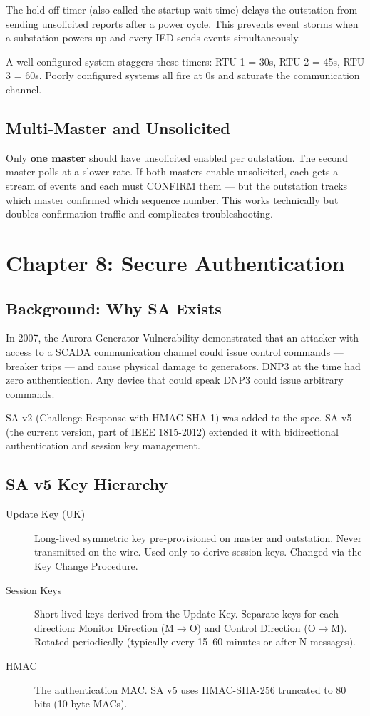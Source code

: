 \documentclass[11pt,twoside]{article}
\begin{document}
The hold-off timer (also called the startup wait time) delays the outstation from sending unsolicited reports after a power cycle. This prevents event storms when a substation powers up and every IED sends events simultaneously.

A well-configured system staggers these timers: RTU 1 = 30s, RTU 2 = 45s, RTU 3 = 60s. Poorly configured systems all fire at 0s and saturate the communication channel.

\subsection{Multi-Master and Unsolicited}

Only \textbf{one master} should have unsolicited enabled per outstation. The second master polls at a slower rate. If both masters enable unsolicited, each gets a stream of events and each must CONFIRM them --- but the outstation tracks which master confirmed which sequence number. This works technically but doubles confirmation traffic and complicates troubleshooting.

\section{Chapter 8: Secure Authentication}

\subsection{Background: Why SA Exists}

In 2007, the Aurora Generator Vulnerability demonstrated that an attacker with access to a SCADA communication channel could issue control commands --- breaker trips --- and cause physical damage to generators. DNP3 at the time had zero authentication. Any device that could speak DNP3 could issue arbitrary commands.

SA v2 (Challenge-Response with HMAC-SHA-1) was added to the spec. SA v5 (the current version, part of IEEE 1815-2012) extended it with bidirectional authentication and session key management.

\subsection{SA v5 Key Hierarchy}

\begin{description}
  \item[Update Key (UK)] Long-lived symmetric key pre-provisioned on master and outstation. Never transmitted on the wire. Used only to derive session keys. Changed via the Key Change Procedure.
  \item[Session Keys] Short-lived keys derived from the Update Key. Separate keys for each direction: Monitor Direction (M$\rightarrow$O) and Control Direction (O$\rightarrow$M). Rotated periodically (typically every 15--60 minutes or after N messages).
  \item[HMAC] The authentication MAC. SA v5 uses HMAC-SHA-256 truncated to 80 bits (10-byte MACs).
\end{description}
\end{document}
